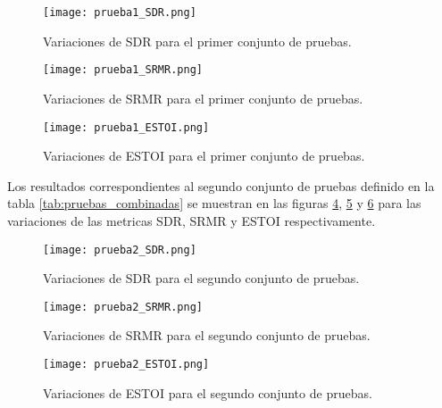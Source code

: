 \begin{figure}[H]
	\centering{}
	\texttt{[image: prueba1\_SDR.png]}
	\caption{Variaciones de SDR para el primer conjunto de pruebas.}
	\label{fig:1_SDR}
\end{figure}

\begin{figure}[H]
	\centering{}
	\texttt{[image: prueba1\_SRMR.png]}
	\caption{Variaciones de SRMR para el primer conjunto de pruebas.}
	\label{fig:1_SRMR}
\end{figure}

\begin{figure}[H]
	\centering{}
	\texttt{[image: prueba1\_ESTOI.png]}
	\caption{Variaciones de ESTOI para el primer conjunto de pruebas.}
	\label{fig:1_ESTOI}
\end{figure}

Los resultados correspondientes al segundo conjunto de pruebas definido en la tabla \ref{tab:pruebas_combinadas} se muestran en las figuras \ref{fig:2_SDR}, \ref{fig:2_SRMR} y \ref{fig:2_ESTOI} para las variaciones de las metricas SDR, SRMR y ESTOI respectivamente.

\begin{figure}[H]
	\centering{}
	\texttt{[image: prueba2\_SDR.png]}
	\caption{Variaciones de SDR para el segundo conjunto de pruebas.}
	\label{fig:2_SDR}
\end{figure}

\begin{figure}[H]
	\centering{}
	\texttt{[image: prueba2\_SRMR.png]}
	\caption{Variaciones de SRMR para el segundo conjunto de pruebas.}
	\label{fig:2_SRMR}
\end{figure}

\begin{figure}[H]
	\centering{}
	\texttt{[image: prueba2\_ESTOI.png]}
	\caption{Variaciones de ESTOI para el segundo conjunto de pruebas.}
	\label{fig:2_ESTOI}
\end{figure}

